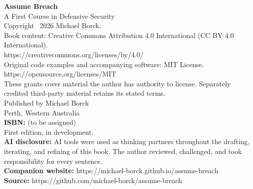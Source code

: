 \thispagestyle{empty}
\vspace*{\fill}

\begin{flushleft}
\textbf{Assume Breach}\\
A First Course in Defensive Security\\[1.5em]
Copyright \textcopyright\ 2026 Michael Borck.\\[1em]
Book content: Creative Commons Attribution 4.0 International (CC BY 4.0 International).\\
https://creativecommons.org/licenses/by/4.0/\\[0.5em]
Original code examples and accompanying software: MIT License.\\
https://opensource.org/licenses/MIT\\[0.5em]
These grants cover material the author has authority to license. Separately credited third-party material retains its stated terms.\\[1em]
Published by Michael Borck\\
Perth, Western Australia\\[1em]
\textbf{ISBN:} (to be assigned)\\[1em]
First edition, in development.\\[1em]
\textbf{AI disclosure:} AI tools were used as thinking partners throughout the drafting, iterating, and refining of this book. The author reviewed, challenged, and took responsibility for every sentence.\\[1em]
\textbf{Companion website:} https://michael-borck.github.io/assume-breach\\
\textbf{Source:} https://github.com/michael-borck/assume-breach
\end{flushleft}

\vspace*{\fill}
\clearpage
